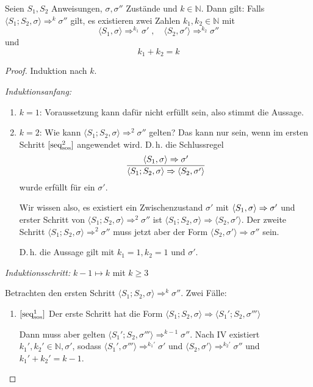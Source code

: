 \begin{lemma}
    Seien $S_1, S_2$ Anweisungen, $\sigma, \sigma''$ Zustände und $k \in \mathbb{N}$.
    Dann gilt: Falls $\langle S_1; S_2, \sigma \rangle \Rightarrow^k \sigma''$ gilt, es existieren zwei Zahlen $k_1, k_2 \in \mathbb{N}$ mit
    \[
        \langle S_1, \sigma \rangle \Rightarrow^{k_1} \sigma'
        \;,\quad
        \langle S_2, \sigma' \rangle \Rightarrow^{k_2} \sigma''
    \]
    und
    \[
        k_1 + k_2 = k
    \]
\end{lemma}
\begin{proof}
    Induktion nach $k$.

    \emph{Induktionsanfang:}
    \begin{enumerate}
        \item $k = 1$: Voraussetzung kann dafür nicht erfüllt sein, also stimmt die Aussage.
        \item $k = 2$: Wie kann $\langle S_1; S_2, \sigma \rangle \Rightarrow^2 \sigma''$ gelten?
            Das kann nur sein, wenn im ersten Schritt $\infruleSos[2]{seq}$ angewendet wird. D.\,h. die Schlussregel
            \[
                \frac{\stranssos{S_1}{\sigma}{\sigma'}}{\stranssos{S_1; S_2}{\sigma}{\langle S_2, \sigma' \rangle}}
            \]
            wurde erfüllt für ein $\sigma'$.

            Wir wissen also, es existiert ein Zwischenzustand $\sigma'$ mit $\stranssos{S_1}{\sigma}{\sigma'}$ und erster Schritt von $\langle S_1; S_2, \sigma \rangle \Rightarrow^2 \sigma''$ ist $\langle S_1; S_2, \sigma \rangle \Rightarrow \langle S_2, \sigma' \rangle$.
            Der zweite Schritt $\langle S_1; S_2, \sigma \rangle \Rightarrow^2 \sigma''$ muss jetzt aber der Form $\langle S_2, \sigma' \rangle \Rightarrow \sigma''$ sein.

            D.\,h. die Aussage gilt mit $k_1 = 1, k_2 = 1$ und $\sigma'$.
    \end{enumerate}

        \par\bigskip
    \emph{Induktionsschritt:} $k - 1 \mapsto k$ mit $k \geq 3$

    Betrachten den ersten Schritt $\langle S_1; S_2, \sigma \rangle \Rightarrow^k \sigma''$.
    Zwei Fälle:
    \begin{enumerate}
        \item $\infruleSos[1]{seq}$ Der erste Schritt hat die Form $\langle S_1; S_2, \sigma \rangle \Rightarrow \langle S_1'; S_2, \sigma''' \rangle$

            Dann muss aber gelten $\langle S_1'; S_2, \sigma''' \rangle \Rightarrow^{k-1} \sigma''$.
            Nach IV existiert $k_1', k_2' \in \mathbb{N}, \sigma'$, sodass $\langle S_1',  \sigma''' \rangle \Rightarrow^{k_1'} \sigma'$ und $\langle S_2,  \sigma' \rangle \Rightarrow^{k_2'} \sigma''$ und $k_1' + k_2' = k - 1$.


\end{enumerate}
\end{proof}
